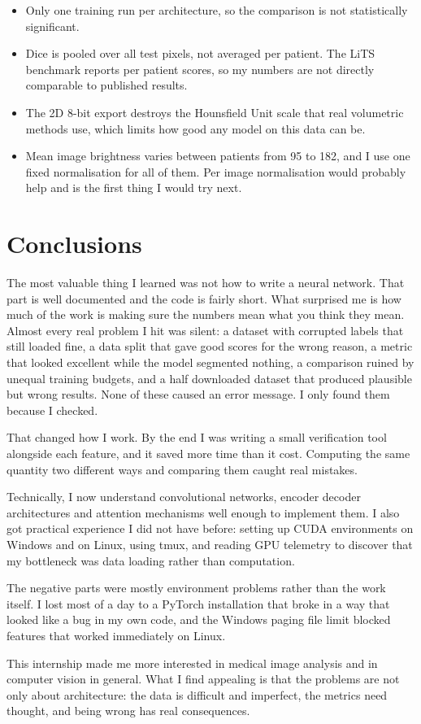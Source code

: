 \documentclass[11pt,a4paper]{article}
\begin{document}
\begin{itemize}
  \item Only one training run per architecture, so the comparison is not
        statistically significant.
  \item Dice is pooled over all test pixels, not averaged per patient. The LiTS
        benchmark reports per patient scores, so my numbers are not directly
        comparable to published results.
  \item The 2D 8-bit export destroys the Hounsfield Unit scale that real
        volumetric methods use, which limits how good any model on this data can
        be.
  \item Mean image brightness varies between patients from 95 to 182, and I use
        one fixed normalisation for all of them. Per image normalisation would
        probably help and is the first thing I would try next.
\end{itemize}

\section{Conclusions}

The most valuable thing I learned was not how to write a neural network. That
part is well documented and the code is fairly short. What surprised me is how
much of the work is making sure the numbers mean what you think they mean. Almost
every real problem I hit was silent: a dataset with corrupted labels that still
loaded fine, a data split that gave good scores for the wrong reason, a metric
that looked excellent while the model segmented nothing, a comparison ruined by
unequal training budgets, and a half downloaded dataset that produced plausible
but wrong results. None of these caused an error message. I only found them
because I checked.

That changed how I work. By the end I was writing a small verification tool
alongside each feature, and it saved more time than it cost. Computing the same
quantity two different ways and comparing them caught real mistakes.

Technically, I now understand convolutional networks, encoder decoder
architectures and attention mechanisms well enough to implement them. I also got practical experience I did not
have before: setting up CUDA environments on Windows and on Linux, using tmux, and reading GPU telemetry to discover that my
bottleneck was data loading rather than computation.

The negative parts were mostly environment problems rather than the work itself.
I lost most of a day to a PyTorch installation that broke in a way that looked
like a bug in my own code, and the Windows paging file limit blocked features
that worked immediately on Linux.

This internship made me more interested in medical image analysis and in
computer vision in general. What I find appealing is that the problems are not
only about architecture: the data is difficult and imperfect, the metrics need
thought, and being wrong has real consequences.
\end{document}
